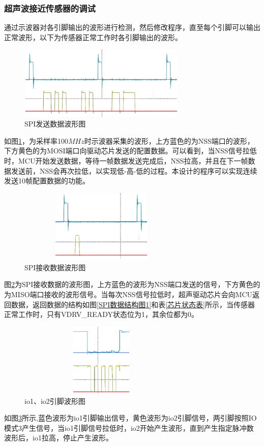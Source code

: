 \subsubsection{超声波接近传感器的调试}
通过示波器对各引脚输出的波形进行检测，然后修改程序，直至每个引脚可以输出正常波形，以下为传感器正常工作时各引脚输出的波形。\par
\begin{figure}[!h]
	\centering
	\includegraphics[width=8cm,height=3.5cm]{figure/debug waveform1.png}
	\caption{SPI发送数据波形图}
	\label{SPI发送数据波形图}
\end{figure}\par
如图\ref{SPI发送数据波形图}，为采样率100$MHz$时示波器采集的波形，上方蓝色的为NSS端口的波形，下方黄色的为MOSI端口向驱动芯片发送的配置数据。可以看到，当NSS信号拉低时，MCU开始发送数据，等待一帧数据发送完成后，NSS拉高，并且在下一帧数据发送前，NSS会再次拉低，以实现低-高-低的过程。本设计的程序可以实现连续发送10帧配置数据的功能。
\begin{figure}[!h]
	\centering
	\includegraphics[width=8cm,height=3.5cm]{figure/debug waveform2.png}
	\caption{SPI接收数据波形图}
	\label{SPI接收数据波形图}
\end{figure}\par
图\ref{SPI接收数据波形图}为SPI接收数据的波形图，上方蓝色的波形为NSS端口发送的信号，下方黄色的为MISO端口接收的波形信号。当每次NSS信号拉低时，超声驱动芯片会向MCU返回数据，返回数据的结构如图\ref{SPI数据结构图1}和表\ref{芯片状态表}所示，当传感器正常工作时，只有VDRV\_READY状态位为1，其余位都为0。
\newpage
\begin{figure}[!h]
	\centering
	\includegraphics[width=8cm,height=3.5cm]{figure/debug waveform9.png}
	\caption{io1、io2引脚波形图}
	\label{io1、io2引脚波形图}
\end{figure}\par
如图\ref{io1、io2引脚波形图}所示,蓝色波形为io1引脚输出信号，黄色波形为io2引脚信号，两引脚按照IO模式3产生信号，当io1引脚信号拉低时，io2开始产生波形，直到产生指定脉冲数波形后，io1拉高，停止产生波形。

